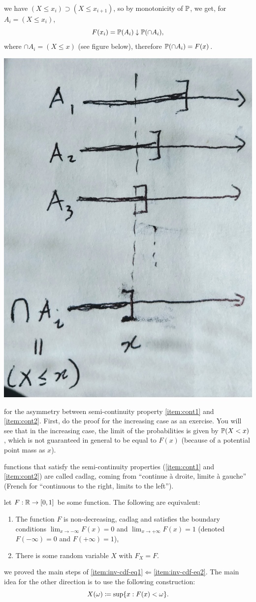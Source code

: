 \documentclass{article}
\begin{document}
 we have $(X \le x_i) \supset (X \le x_{i+1})$, so by monotonicity of $\P$, we get, for $A_i = (X \le x_i)$,
\[ F(x_i) = \P(A_i) \downarrow \P(\cap A_i), \]
where $\cap A_i = (X \le x)$ (see figure below), therefore $\P(\cap A_i) = F(x)$.
\begin{center}
	\includegraphics[width=0.3\linewidth]{figures/limit-cdf}
\end{center}

 for the asymmetry between semi-continuity property \ref{item:cont1} and \ref{item:cont2}. First, do the proof for the increasing case as an exercise. You will see that in the increasing case, the limit of the probabilities is given by $\P(X < x)$, which is not guaranteed in general to be equal to $F(x)$ (because of a potential point mass as $x$).

 functions that satisfy the semi-continuity properties (\ref{item:cont1} and \ref{item:cont2}) are called cadlag, coming from ``continue \`a droite, limite \`a gauche'' (French for ``continuous to the right, limits to the left'').

 let $F : \R \to [0, 1]$ be some function. The following are equivalent:
\begin{enumerate}
  \item \label{item:inv-cdf-eq1} The function $F$ is non-decreasing, cadlag and satisfies the boundary conditions $\lim_{x \to -\infty} F(x) = 0$ and $\lim_{x \to +\infty} F(x) = 1$ (denoted $F(-\infty) = 0$ and $F(+\infty) = 1$),
  \item \label{item:inv-cdf-eq2} There is some random variable $X$ with $F_X = F$.
\end{enumerate}

 we proved the main steps of \ref{item:inv-cdf-eq1}$\Longleftarrow$\ref{item:inv-cdf-eq2}. The main idea for the other direction is to use the following construction:
\[ X(\omega) \defeq \sup\{x : F(x) < \omega\}. \]
\end{document}
